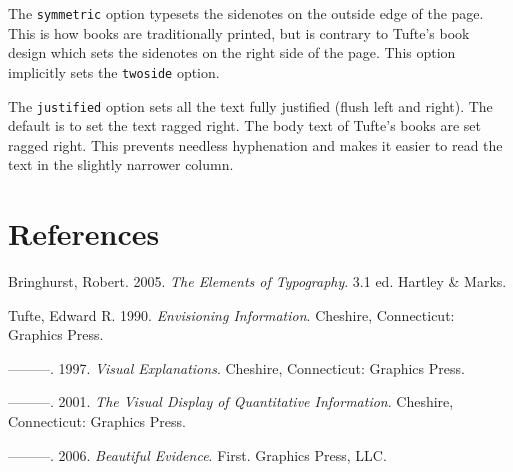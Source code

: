 \documentclass[
  twoside,
  symmetric]{tufte-book}
\newlength{\cslhangindent}
\newenvironment{CSLReferences}[2] %
 {\begin{list}{}{%
  \setlength{\itemindent}{0pt}
  \setlength{\leftmargin}{0pt}
  \setlength{\parsep}{0pt}
  \ifodd #1
   \setlength{\leftmargin}{\cslhangindent}
   \setlength{\itemindent}{-1\cslhangindent}
  \fi
  \setlength{\itemsep}{#2\baselineskip}}}
 {\end{list}}
\begin{document}
The \texttt{symmetric} option typesets the sidenotes on the outside edge
of the page. This is how books are traditionally printed, but is
contrary to Tufte's book design which sets the sidenotes on the right
side of the page. This option implicitly sets the \texttt{twoside}
option.

The \texttt{justified} option sets all the text fully justified (flush
left and right). The default is to set the text ragged right. The body
text of Tufte's books are set ragged right. This prevents needless
hyphenation and makes it easier to read the text in the slightly
narrower column.

\chapter*{References}\label{references-1}

\label{refs}
\begin{CSLReferences}{1}{0}
Bringhurst, Robert. 2005. \emph{The Elements of Typography}. 3.1 ed.
Hartley \& Marks.

Tufte, Edward R. 1990. \emph{Envisioning Information}. Cheshire,
Connecticut: Graphics Press.

---------. 1997. \emph{Visual Explanations}. Cheshire, Connecticut:
Graphics Press.

---------. 2001. \emph{The Visual Display of Quantitative Information}.
Cheshire, Connecticut: Graphics Press.

---------. 2006. \emph{Beautiful Evidence}. First. Graphics Press,
{LLC}.

\end{CSLReferences}


\backmatter
\end{document}
